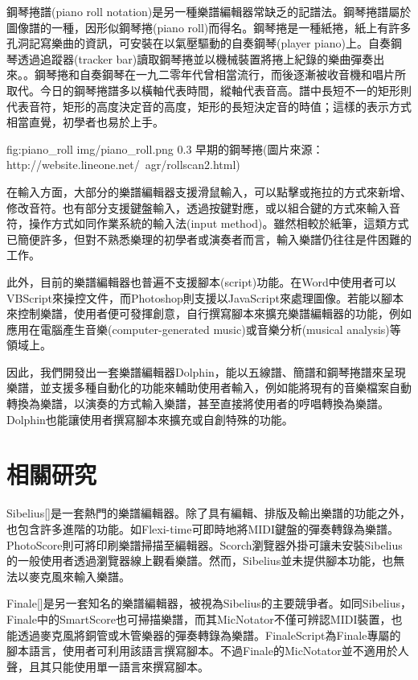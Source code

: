 \documentclass[12pt,a4paper,oneside]{report}
\begin{document}
鋼琴捲譜(piano roll notation)是另一種樂譜編輯器常缺乏的記譜法。鋼琴捲譜屬於圖像譜的一種，因形似鋼琴捲(piano roll)而得名。鋼琴捲是一種紙捲，紙上有許多孔洞記寫樂曲的資訊，可安裝在以氣壓驅動的自奏鋼琴(player piano)上。自奏鋼琴透過追蹤器(tracker bar)讀取鋼琴捲並以機械裝置將捲上紀錄的樂曲彈奏出來。。鋼琴捲和自奏鋼琴在一九二零年代曾相當流行，而後逐漸被收音機和唱片所取代\cite{thePiano}。今日的鋼琴捲譜多以橫軸代表時間，縱軸代表音高。譜中長短不一的矩形則代表音符，矩形的高度決定音的高度，矩形的長短決定音的時值；這樣的表示方式相當直覺，初學者也易於上手。

\figurewithcaption
{fig:piano_roll}
{img/piano_roll.png}
{0.3}
{早期的鋼琴捲(圖片來源：http://website.lineone.net/~agr/rollscan2.html)}

在輸入方面，大部分的樂譜編輯器支援滑鼠輸入，可以點擊或拖拉的方式來新增、修改音符。也有部分支援鍵盤輸入，透過按鍵對應，或以組合鍵的方式來輸入音符，操作方式如同作業系統的輸入法(input method)。雖然相較於紙筆，這類方式已簡便許多，但對不熟悉樂理的初學者或演奏者而言，輸入樂譜仍往往是件困難的工作。

此外，目前的樂譜編輯器也普遍不支援腳本(script)功能。在Word中使用者可以VBScript來操控文件，而Photoshop則支援以JavaScript來處理圖像。若能以腳本來控制樂譜，使用者便可發揮創意，自行撰寫腳本來擴充樂譜編輯器的功能，例如應用在電腦產生音樂(computer-generated music)或音樂分析(musical analysis)等領域上。

因此，我們開發出一套樂譜編輯器Dolphin，能以五線譜、簡譜和鋼琴捲譜來呈現樂譜，並支援多種自動化的功能來輔助使用者輸入，例如能將現有的音樂檔案自動轉換為樂譜，以演奏的方式輸入樂譜，甚至直接將使用者的哼唱轉換為樂譜。Dolphin也能讓使用者撰寫腳本來擴充或自創特殊的功能。

\section{相關研究}

Sibelius[]是一套熱門的樂譜編輯器。除了具有編輯、排版及輸出樂譜的功能之外，也包含許多進階的功能。如Flexi-time可即時地將MIDI鍵盤的彈奏轉錄為樂譜。PhotoScore則可將印刷樂譜掃描至編輯器。Scorch瀏覽器外掛可讓未安裝Sibelius的一般使用者透過瀏覽器線上觀看樂譜。然而，Sibelius並未提供腳本功能，也無法以麥克風來輸入樂譜。

Finale[]是另一套知名的樂譜編輯器，被視為Sibelius的主要競爭者。如同Sibelius，Finale中的SmartScore也可掃描樂譜，而其MicNotator不僅可辨認MIDI裝置，也能透過麥克風將銅管或木管樂器的彈奏轉錄為樂譜。FinaleScript為Finale專屬的腳本語言，使用者可利用該語言撰寫腳本。不過Finale的MicNotator並不適用於人聲，且其只能使用單一語言來撰寫腳本。
\end{document}
